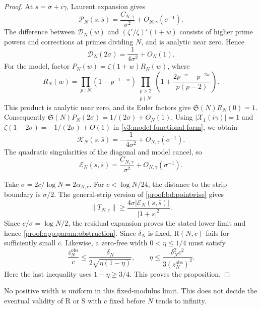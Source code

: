 \documentclass[12pt,a4paper]{amsart}
\numberwithin{equation}{section}
\def\le{\leqslant}
\def\ge{\geqslant}
\theoremstyle{plain}
\theoremstyle{definition}
\theoremstyle{remark}
\begin{document}
\begin{proof}
At $s=\sigma+i\gamma$, Laurent expansion gives
\begin{equation}\label{proof:qp:small-c-correlation}
 \mathscr P_N(s,\bar s)=\frac{C_{N,\gamma}}{\sigma^2}
                         +O_{N,\gamma}(\sigma^{-1}).
\end{equation}
The difference between $\mathscr D_N(w)$ and
$(\zeta'/\zeta)'(1+w)$ consists of higher prime powers and
corrections at primes dividing $N$, and is analytic near zero. Hence
\begin{equation}\label{proof:qp:small-c-diagonal}
 \mathscr D_N(2\sigma)=\frac1{4\sigma^2}+O_N(1).
\end{equation}
For the model, factor $P_N(w)=\zeta(1+w)R_N(w)$, where
\[
 R_N(w)=\prod_{p\mid N}(1-p^{-1-w})
 \prod_{\substack{p>2\\p\nmid N}}
 \left(1+\frac{2p^{-w}-p^{-2w}}{p(p-2)}\right).
\]
This product is analytic near zero, and its Euler factors give
$\mathfrak S(N)R_N(0)=1$. Consequently
$\mathfrak S(N)P_N(2\sigma)=1/(2\sigma)+O_N(1)$.
Using $|\mathcal X_1(i\gamma)|=1$ and
$\zeta(1-2\sigma)=-1/(2\sigma)+O(1)$ in
\eqref{v3:model-functional-form}, we obtain
\begin{equation}\label{proof:qp:small-c-model}
 \mathscr K_N(s,\bar s)=-\frac1{4\sigma^2}
                         +O_{N,\gamma}(\sigma^{-1}).
\end{equation}
The quadratic singularities of the diagonal and model cancel, so
\[
 \mathscr E_N(s,\bar s)=\frac{C_{N,\gamma}}{\sigma^2}
                         +O_{N,\gamma}(\sigma^{-1}).
\]

Take $\sigma=2c/\log N=2\alpha_{N,c}$. For $c<\log N/24$,
the distance to the strip boundary is $\sigma/2$.
The general-strip version of \eqref{proof:bd:pointwise} gives
\[
 \|T_{N,c}\|\ge
 \frac{4\sigma|\mathscr E_N(s,\bar s)|}{|1+s|^2}.
\]
Since $c/\sigma=\log N/2$, the residual expansion proves the
stated lower limit and hence \eqref{proof:app:param:obstruction}.
Since $\delta_N$ is fixed, $\mathrm R(N,c)$ fails for sufficiently
small $c$. Likewise, a zero-free width $0<\eta\le1/4$ must satisfy
\[
 \frac{z_N^{\mathrm{obs}}}{c}
 \le\frac{\delta_N}{2\sqrt{\eta(1-\eta)}},
 \qquad
 \eta\le\frac{\delta_N^2c^2}{3(z_N^{\mathrm{obs}})^2}.
\]
Here the last inequality uses $1-\eta\ge3/4$.
This proves the proposition.
\end{proof}

No positive width is uniform in this fixed-modulus limit.
This does not decide the eventual validity of R or S with $c$
fixed before $N$ tends to infinity.
\end{document}
